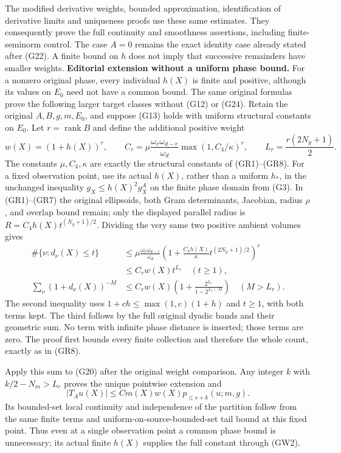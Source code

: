\documentclass[
  11pt,
]{article}
\begin{document}
The modified derivative weights, bounded approximation, identification
of derivative limits and uniqueness proofs use these same estimates.
They consequently prove the full continuity and smoothness assertions,
including finite-seminorm control. The case \(A=0\) remains the exact
identity case already stated after (G22). A finite bound on \(h\) does
not imply that successive remainders have smaller weights.
\textbf{Editorial extension without a uniform phase bound.} For a
nonzero original phase, every individual \(h(X)\) is finite and
positive, although its values on \(E_0\) need not have a common bound.
The same original formulas prove the following larger target classes
without (G12) or (G24). Retain the original \(A,B,g,m,E_0\), and suppose
(G13) holds with uniform structural constants on \(E_0\). Let
\(r=\operatorname{rank}B\) and define the additional positive weight \[
 w(X)=(1+h(X))^r,\qquad
 C_r=\mu\frac{\omega_r\omega_{d-r}}{\omega_d}
       \max(1,C_4/\kappa)^r,\qquad
 L_r=\frac{r(2N_g+1)}2.
 \tag{GW1}
\] The constants \(\mu,C_4,\kappa\) are exactly the structural constants
of (GR1)--(GR8). For a fixed observation point, use its actual \(h(X)\),
rather than a uniform \(h_*\), in the unchanged inequality
\(g_X\leq h(X)^2g_X^A\) on the finite phase domain from (G3). In
(GR1)--(GR7) the original ellipsoids, both Gram determinants, Jacobian,
radius \(\rho\), and overlap bound remain; only the displayed parallel
radius is \(R=C_4h(X)t^{(N_g+1)/2}\). Dividing the very same two
positive ambient volumes gives \[
 \begin{aligned}
 \#\{\nu:d_\nu(X)\leq t\}
 &\leq\mu\frac{\omega_r\omega_{d-r}}{\omega_d}
       \left(1+\frac{C_4h(X)}{\kappa}t^{(2N_g+1)/2}\right)^r\\
 &\leq C_rw(X)t^{L_r}\quad(t\geq1),\\
 \sum_\nu(1+d_\nu(X))^{-M}
 &\leq C_rw(X)\left(1+\frac{2^{L_r}}{1-2^{L_r-M}}\right)
       \quad(M>L_r).
 \end{aligned}
 \tag{GW2}
\] The second inequality uses \(1+ch\leq\max(1,c)(1+h)\) and \(t\geq1\),
with both terms kept. The third follows by the full original dyadic
bands and their geometric sum. No term with infinite phase distance is
inserted; those terms are zero. The proof first bounds every finite
collection and therefore the whole count, exactly as in (GR8).

Apply this sum to (G20) after the original weight comparison. Any
integer \(k\) with \(k/2-N_m>L_r\) proves the unique pointwise extension
and \[
 |T_Au(X)|\leq C m(X)w(X)p_{\leq s+k}(u;m,g).
 \tag{GW3}
\] Its bounded-set local continuity and independence of the partition
follow from the same finite terms and uniform-on-source-bounded-set tail
bound at this fixed point. Thus even at a single observation point a
common phase bound is unnecessary; its actual finite \(h(X)\) supplies
the full constant through (GW2).
\end{document}
